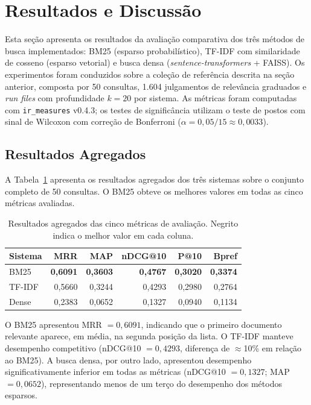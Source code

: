\documentclass[12pt]{article}
\begin{document}
\section{Resultados e Discussão}
\label{sec:resultados}

Esta seção apresenta os resultados da avaliação comparativa dos três métodos de
busca implementados: BM25 (esparso probabilístico), TF-IDF com similaridade de
cosseno (esparso vetorial) e busca densa (\textit{sentence-transformers} +
FAISS). Os experimentos foram conduzidos sobre a coleção de referência descrita
na seção anterior, composta por 50 consultas, 1.604 julgamentos de relevância
graduados e \textit{run files} com profundidade $k = 20$ por sistema. As
métricas foram computadas com \texttt{ir\_measures} v0.4.3; os testes de
significância utilizam o teste de postos com sinal de Wilcoxon com correção de
Bonferroni ($\alpha = 0{,}05 / 15 \approx 0{,}0033$).

\subsection{Resultados Agregados}

A Tabela~\ref{tab:agregado} apresenta os resultados agregados dos três sistemas
sobre o conjunto completo de 50 consultas. O BM25 obteve os melhores valores em
todas as cinco métricas avaliadas.

\begin{table}[ht]
\centering
\caption{Resultados agregados das cinco métricas de avaliação. Negrito indica o
melhor valor em cada coluna.}
\label{tab:agregado}
\begin{tabular}{lrrrrr}
\toprule
\textbf{Sistema} & \textbf{MRR} & \textbf{MAP} & \textbf{nDCG@10} & \textbf{P@10} & \textbf{Bpref} \\
\midrule
BM25   & \textbf{0{,}6091} & \textbf{0{,}3603} & \textbf{0{,}4767} & \textbf{0{,}3020} & \textbf{0{,}3374} \\
TF-IDF & 0{,}5660 & 0{,}3244 & 0{,}4293 & 0{,}2980 & 0{,}2764 \\
Dense  & 0{,}2383 & 0{,}0652 & 0{,}1327 & 0{,}0940 & 0{,}1134 \\
\bottomrule
\end{tabular}
\end{table}

O BM25 apresentou MRR $= 0{,}6091$, indicando que o primeiro documento relevante
aparece, em média, na segunda posição da lista. O TF-IDF manteve desempenho
competitivo (nDCG@10 $= 0{,}4293$, diferença de $\approx$10\% em relação ao
BM25). A busca densa, por outro lado, apresentou desempenho significativamente
inferior em todas as métricas (nDCG@10 $= 0{,}1327$; MAP $= 0{,}0652$),
representando menos de um terço do desempenho dos métodos esparsos.
\end{document}
